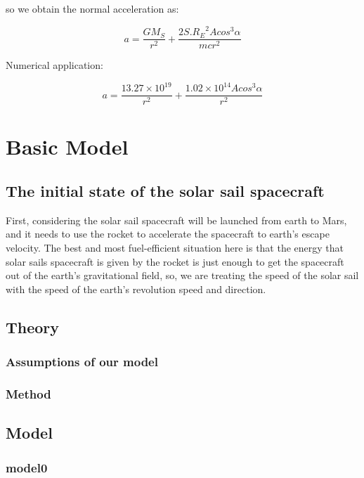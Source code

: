 \documentclass[../Paper.tex]{subfiles}
\begin{document}
so we obtain the normal acceleration as:

\begin{equation}
a=\dfrac{GM_S}{r^2}+\dfrac{2S.{R_E}^2Acos^3\alpha}{mcr^2}
\end{equation}

Numerical application:

\begin{equation}
a=\dfrac{13.27\times10^{19}}{r^2}+\dfrac{1.02\times10^{14}Acos^3\alpha}{r^2}
\end{equation}




\section{Basic Model}
\subsection{The initial state of the solar sail spacecraft}
First, considering the solar sail spacecraft will be launched from earth to Mars, and it needs to use the rocket to accelerate the spacecraft to earth's escape velocity. The best and most fuel-efficient situation here is that the energy that solar sails spacecraft is given by the rocket is just enough to get the spacecraft out of the earth's gravitational field, so, we are treating the speed of the solar sail with the speed of the earth's revolution speed  and direction.

\subsection{Theory}

\subsubsection{Assumptions of our model}

\subsubsection{Method}

\subsection{Model}
\subsubsection{model0}
\end{document}

